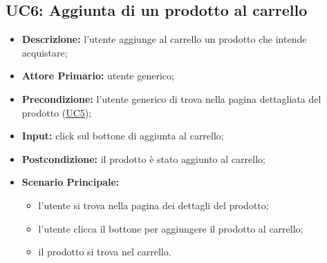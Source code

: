 \subsection{UC6: Aggiunta di un prodotto al carrello}
        \label{sec:UC6}
        \begin{itemize}
            \item \textbf{Descrizione:} l'utente aggiunge al carrello un prodotto che intende acquistare;
            \item \textbf{Attore Primario:} utente generico;
            \item \textbf{Precondizione:} l'utente generico di trova nella pagina dettagliata del prodotto (\hyperref[sec:UC5]{\underline{UC5}});
            \item \textbf{Input:} click sul bottone di aggiunta al carrello;
            \item \textbf{Postcondizione:} il prodotto è stato aggiunto al carrello;
            \item \textbf{Scenario Principale:}
            \begin{itemize}
                \item l'utente si trova nella pagina dei dettagli del prodotto;
                \item l'utente clicca il bottone per aggiungere il prodotto al carrello;
                \item il prodotto si trova nel carrello.
            \end{itemize}
        \end{itemize}